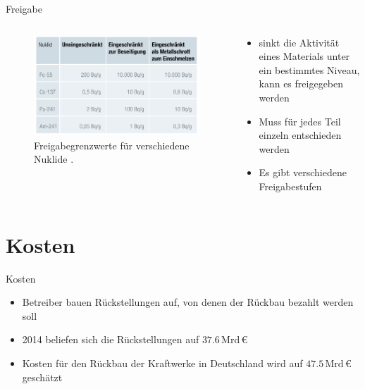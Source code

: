 \begin{frame}{Freigabe}
  \begin{columns}

    \begin{column}{0.48\textwidth}
      \begin{figure}
         \centering
         \includegraphics[width=1\textwidth]{./bilder/freigabeoption.PNG}
         \caption{Freigabegrenzwerte für verschiedene Nuklide \cite{stilllegung_grs}. }
         \label{ fig: freigabegrenzwerte}
       \end{figure}
    \end{column}

    \begin{column}{0.48\textwidth}
      \begin{itemize}
        \setlength\itemsep{1.2em}
        \item{ sinkt die Aktivität eines Materials unter ein bestimmtes Niveau, kann es freigegeben werden }
        \item{ Muss für jedes Teil einzeln entschieden werden}
        \item {Es gibt verschiedene Freigabestufen}
      \end{itemize}
    \end{column}

  \end{columns}
\end{frame}



\section{Kosten}



\begin{frame}{Kosten}
  \begin{itemize}
    \setlength\itemsep{1.2em}
    \item{ Betreiber bauen Rückstellungen auf, von denen der Rückbau bezahlt werden soll}
    \item{ 2014 beliefen sich die Rückstellungen auf $\num{37.6} \, \mathrm{Mrd} \,\euro$}
    \item{Kosten für den Rückbau der Kraftwerke in Deutschland wird auf  $\num{47.5} \, \mathrm{Mrd} \,\euro$ geschätzt}
  \end{itemize}
\end{frame}



